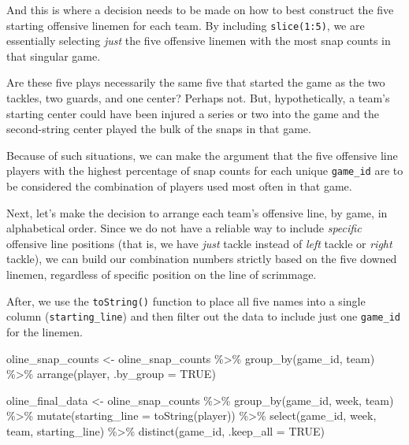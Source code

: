 \documentclass[
  letterpaper,
]{krantz}
\newenvironment{Shaded}{\begin{snugshade}}{\end{snugshade}}
\newcommand{\AttributeTok}[1]{\textcolor[rgb]{0.40,0.45,0.13}{#1}}
\newcommand{\ConstantTok}[1]{\textcolor[rgb]{0.56,0.35,0.01}{#1}}
\newcommand{\FunctionTok}[1]{\textcolor[rgb]{0.28,0.35,0.67}{#1}}
\newcommand{\NormalTok}[1]{\textcolor[rgb]{0.00,0.23,0.31}{#1}}
\newcommand{\OtherTok}[1]{\textcolor[rgb]{0.00,0.23,0.31}{#1}}
\newcommand{\SpecialCharTok}[1]{\textcolor[rgb]{0.37,0.37,0.37}{#1}}
\begin{document}
And this is where a decision needs to be made on how to best construct
the five starting offensive linemen for each team. By including
\texttt{slice(1:5)}, we are essentially selecting \emph{just} the five
offensive linemen with the most snap counts in that singular game.

Are these five plays necessarily the same five that started the game as
the two tackles, two guards, and one center? Perhaps not. But,
hypothetically, a team's starting center could have been injured a
series or two into the game and the second-string center played the bulk
of the snaps in that game.

Because of such situations, we can make the argument that the five
offensive line players with the highest percentage of snap counts for
each unique \texttt{game\_id} are to be considered the combination of
players used most often in that game.

Next, let's make the decision to arrange each team's offensive line, by
game, in alphabetical order. Since we do not have a reliable way to
include \emph{specific} offensive line positions (that is, we have
\emph{just} tackle instead of \emph{left} tackle or \emph{right}
tackle), we can build our combination numbers strictly based on the five
downed linemen, regardless of specific position on the line of
scrimmage.

After, we use the \texttt{toString()} function to place all five names
into a single column (\texttt{starting\_line}) and then filter out the
data to include just one \texttt{game\_id} for the linemen.

\begin{Shaded}
\begin{Highlighting}[]
\NormalTok{oline\_snap\_counts }\OtherTok{\textless{}{-}}\NormalTok{ oline\_snap\_counts }\SpecialCharTok{\%\textgreater{}\%}
  \FunctionTok{group\_by}\NormalTok{(game\_id, team) }\SpecialCharTok{\%\textgreater{}\%}
  \FunctionTok{arrange}\NormalTok{(player, }\AttributeTok{.by\_group =} \ConstantTok{TRUE}\NormalTok{)}

\NormalTok{oline\_final\_data }\OtherTok{\textless{}{-}}\NormalTok{ oline\_snap\_counts }\SpecialCharTok{\%\textgreater{}\%}
  \FunctionTok{group\_by}\NormalTok{(game\_id, week, team) }\SpecialCharTok{\%\textgreater{}\%}
  \FunctionTok{mutate}\NormalTok{(}\AttributeTok{starting\_line =} \FunctionTok{toString}\NormalTok{(player)) }\SpecialCharTok{\%\textgreater{}\%}
  \FunctionTok{select}\NormalTok{(game\_id, week, team, starting\_line) }\SpecialCharTok{\%\textgreater{}\%}
  \FunctionTok{distinct}\NormalTok{(game\_id, }\AttributeTok{.keep\_all =} \ConstantTok{TRUE}\NormalTok{)}
\end{Highlighting}
\end{Shaded}
\end{document}
